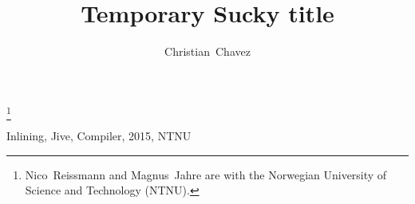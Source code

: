 \documentclass[journal]{IEEEtran}
\begin{document}
\title{Temporary Sucky title}
\author{Christian~Chavez}
\thanks{Nico~Reissmann and Magnus~Jahre are with the Norwegian University of Science and Technology (NTNU).}

\maketitle

\begin{IEEEkeywords}
Inlining, Jive, Compiler, 2015, NTNU
\end{IEEEkeywords}
\IEEEpeerreviewmaketitle












\end{document}
